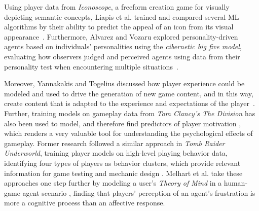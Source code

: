 
Using player data from \textit{Iconoscope}, a freeform creation game for visually depicting semantic concepts, Liapis et al. trained and compared several ML algorithms by their ability to predict the appeal of an icon from its visual appearance~\cite{liapismodellingquality19}.  Furthermore, Alvarez and Vozaru explored personality-driven agents based on individuals' personalities using the \textit{cibernetic big five model}, evaluating how observers judged and perceived agents using data from their personality test when encountering multiple situations~\cite{Alvoz2019-PersonalityDriven}.

Moreover, Yannakakis and Togelius discussed how player experience could be modeled and used to drive the generation of new game content, and in this way, create content that is adapted to the experience and expectations of the player~\cite{Yannakakis2011-experiencedrivenPCG}. Further, training models on gameplay data from \textit{Tom Clancy's The Division} has also been used to model, and therefore find predictors of player motivation \cite{Melhart2019-ModellingMotivation}, which renders a very valuable tool for understanding the psychological effects of gameplay. Former research followed a similar approach in \textit{Tomb Raider Underworld}, training player models on high-level playing behavior data, identifying four types of players as behavior clusters, which provide relevant information for game testing and mechanic design \cite{Drachen2009-playerModellingTombRaider}. Melhart et al. take these approaches one step further by modeling a user's \textit{Theory of Mind} in a human-game agent scenario \cite{melhart2020feel}, finding that players' perception of an agent's frustration is more a cognitive process than an affective response.

